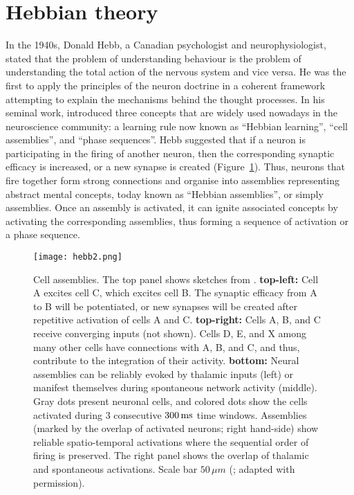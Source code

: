 \section{Hebbian theory}
\label{sec:hebb}
  In the 1940s, Donald Hebb, a Canadian psychologist and neurophysiologist,
  stated that the problem of understanding behaviour is the problem of
  understanding the total action of the nervous system and vice versa. He was
  the first to apply the principles of the neuron doctrine \citep{Cajal1894} in
  a coherent framework attempting to explain the mechanisms behind the thought
  processes. In his seminal work, \cite{Hebb49} introduced three concepts that
  are widely used nowadays in the neuroscience community: a learning rule now
  known as ``Hebbian learning'', ``cell assemblies'', and ``phase sequences''. Hebb
  suggested that if a neuron is participating in the firing of another neuron,
  then the corresponding synaptic efficacy is increased, or a new synapse is
  created (Figure~\ref{fig:hebb}). Thus, neurons that fire together form strong
  connections and organise into assemblies representing abstract mental
  concepts, today known as ``Hebbian assemblies'', or simply assemblies. Once an
  assembly is activated, it can ignite associated concepts by activating the
  corresponding assemblies, thus forming a sequence of activation or a phase
  sequence.
   
    \begin{figure}
      \center
      \texttt{[image: hebb2.png]}
      \caption{Cell assemblies.
        The top panel shows sketches from \cite{Hebb49}. {\bf top-left:} Cell
        A excites cell C, which excites cell B. The synaptic efficacy from A to
        B will be potentiated, or new synapses will be created after repetitive
        activation of cells A and C. {\bf top-right:} Cells A, B, and C receive
        converging inputs (not shown). Cells D, E, and X among many other cells
        have connections with A, B, and C, and thus, contribute to the
        integration of their activity. {\bf bottom:} Neural assemblies can be
        reliably evoked by thalamic inputs (left) or manifest themselves during
        spontaneous network activity (middle). Gray dots present neuronal
        cells, and colored dots show the cells activated during 3 consecutive
        $300\,\rm ms$ time windows. Assemblies (marked by the overlap of
        activated neurons; right hand-side) show reliable spatio-temporal activations
        where the sequential order of firing is preserved. The right panel
        shows the overlap of thalamic and spontaneous activations.  Scale bar
        $50\, \mu m$ (\citealp{Luczak2012}; adapted with permission).
             }
    \label{fig:hebb}
    \end{figure}


